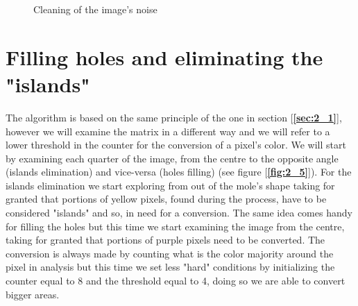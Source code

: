 \documentclass[12pt]{report}
\begin{document}
\begin{figure}[h]
\centering
{}
\qquad
{}
\caption{Cleaning of the image's noise}
\label{fig:dataset3} 
\end{figure}


\section{Filling holes and eliminating the "islands"}\label{sec:2_2}

The algorithm is based on the same principle of the one in section [\textbf{\ref{sec:2_1}}], however we will examine the matrix in a different way and we will refer to a lower threshold in the counter for the conversion of a pixel's color. We will start by examining each quarter of the image, from the centre to the opposite angle (islands elimination) and vice-versa (holes filling) (see figure [\textbf{\ref{fig:2_5}}]). For the islands elimination we start exploring from out of the mole's shape taking for granted that portions of yellow pixels, found during the process, have to be considered "islands" and so, in need for a conversion. The same idea comes handy for filling the holes but this time we start examining the image from the centre, taking for granted that portions of purple pixels need to be converted. The conversion is always made by counting what is the color majority around the pixel in analysis but this time we set less "hard" conditions by initializing the counter equal to 8 and the threshold equal to 4, doing so we are able to convert bigger areas.
\end{document}

